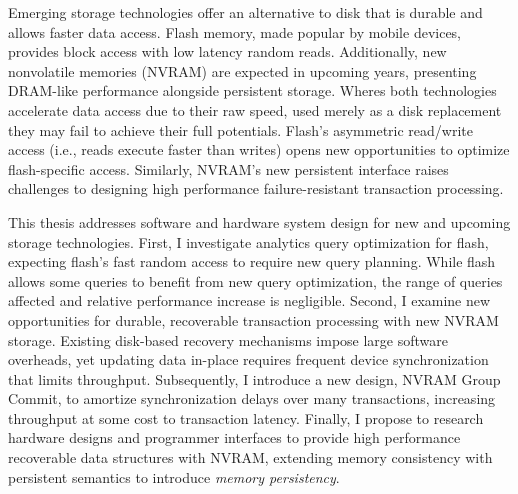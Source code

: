 Emerging storage technologies offer an alternative to disk that is durable and allows faster data access.
Flash memory, made popular by mobile devices, provides block access with low latency random reads.
Additionally, new nonvolatile memories (NVRAM) are expected in upcoming years, presenting DRAM-like performance alongside persistent storage.
Wheres both technologies accelerate data access due to their raw speed, used merely as a disk replacement they may fail to achieve their full potentials.
Flash's asymmetric read/write access (i.e., reads execute faster than writes) opens new opportunities to optimize flash-specific access.
Similarly, NVRAM's new persistent interface raises challenges to designing high performance failure-resistant transaction processing.

This thesis addresses software and hardware system design for new and upcoming storage technologies.
First, I investigate analytics query optimization for flash, expecting flash's fast random access to require new query planning.
While flash allows some queries to benefit from new query optimization, the range of queries affected and relative performance increase is negligible.
Second, I examine new opportunities for durable, recoverable transaction processing with new NVRAM storage.
Existing disk-based recovery mechanisms impose large software overheads, yet updating data in-place requires frequent device synchronization that limits throughput.
Subsequently, I introduce a new design, NVRAM Group Commit, to amortize synchronization delays over many transactions, increasing throughput at some cost to transaction latency.
Finally, I propose to research hardware designs and programmer interfaces to provide high performance recoverable data structures with NVRAM, extending memory consistency with persistent semantics to introduce \emph{memory persistency}.
